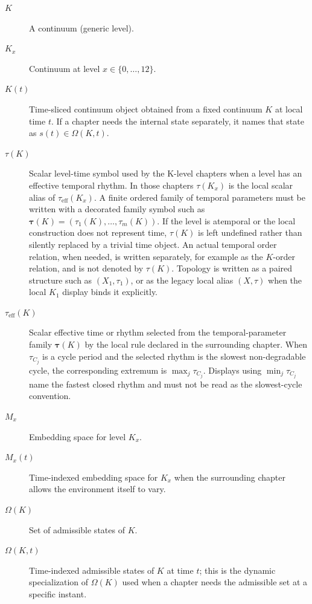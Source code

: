 \begin{description}
  \item[\(K\)] A continuum (generic level).
  \item[\(K_x\)] Continuum at level \(x\in\{0,\dots,12\}\).
  \item[\(K(t)\)] Time-sliced continuum object obtained from a fixed continuum
        \(K\) at local time \(t\). If a chapter needs the internal state
        separately, it names that state as \(s(t)\in\Omega(K,t)\).
  \item[\(\tau(K)\)] Scalar level-time symbol used by the K-level chapters when
        a level has an effective temporal rhythm. In those chapters
        \(\tau(K_x)\) is the local scalar alias of
        \(\tau_{\mathrm{eff}}(K_x)\). A finite ordered family of temporal
        parameters must be written with a decorated family symbol such as
        \(\boldsymbol{\tau}(K)=(\tau_1(K),\dots,\tau_m(K))\). If the level is
        atemporal or the local construction does not represent time,
        \(\tau(K)\) is left undefined rather than silently replaced by a trivial
        time object. An actual temporal order relation, when needed, is written
        separately, for example as the \(K\)-order relation, and is not denoted by
        \(\tau(K)\). Topology is written as a paired structure such as
        \((X_1,\tau_1)\), or as the legacy local alias \((X,\tau)\) when the
        local \(K_1\) display binds it explicitly.
  \item[\(\tau_{\mathrm{eff}}(K)\)] Scalar effective time or rhythm selected
        from the temporal-parameter family \(\boldsymbol{\tau}(K)\) by the local rule
        declared in the surrounding chapter. When \(\tau_{C_j}\) is a cycle
        period and the selected rhythm is the slowest non-degradable cycle, the
        corresponding extremum is \(\max_j\tau_{C_j}\). Displays using
        \(\min_j\tau_{C_j}\) name the fastest closed rhythm and must not be read
        as the slowest-cycle convention.
  \item[\(M_x\)] Embedding space for level \(K_x\).
  \item[\(M_x(t)\)] Time-indexed embedding space for \(K_x\) when the
        surrounding chapter allows the environment itself to vary.
  \item[\(\Omega(K)\)] Set of admissible states of \(K\).
  \item[\(\Omega(K,t)\)] Time-indexed admissible states of \(K\) at time
        \(t\); this is the dynamic specialization of \(\Omega(K)\) used when a
        chapter needs the admissible set at a specific instant.

\end{description}
